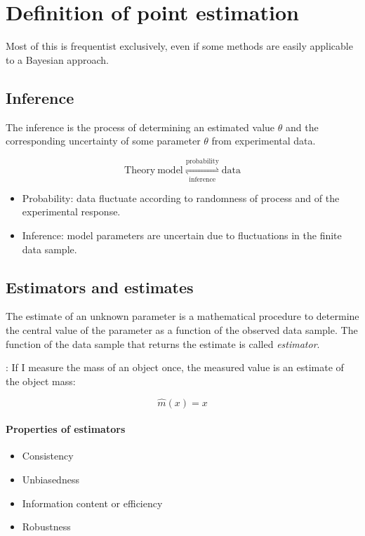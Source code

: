 

\section{Definition of point estimation}
\label{sec:def_of_point_estimation}

Most of this is frequentist exclusively, even if some methods are easily applicable to a Bayesian approach.

\subsection{Inference}
\label{subsec:point_estimation_inference}

The inference is the process of determining an estimated value $\hat{\theta}$ and the corresponding uncertainty of some parameter $\theta$ from experimental data.

$$
	\mathrm{Theory \ model} 
	\overset{\mathrm{probability}}
	{
		\underset{\mathrm{inference}}
		{\rightleftharpoons}
	} 
	  \mathrm{data}
$$

\begin{itemize}
	\item Probability: data fluctuate according to randomness of process and of the experimental response.
	\item Inference: model parameters are uncertain due to fluctuations in the finite data sample.
\end{itemize}

\subsection{Estimators and estimates}
\label{subsec:point_estimator_and_estimate}

The estimate of an unknown parameter is a mathematical procedure to determine the central value of the parameter as a function of the observed data sample.
The function of the data sample that returns the estimate is called \emph{estimator}.

: If I measure the mass of an object once, the measured value is an estimate of the object mass:

$$
\hat{m}(x) = x
$$

\paragraph{Properties of estimators}

\begin{itemize}[$\to$]
	\item Consistency
	\item Unbiasedness
	\item Information content or efficiency
	\item Robustness
\end{itemize}
